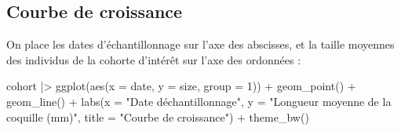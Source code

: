 \documentclass[
  french,
  a4paper,
  DIV=11,
  numbers=noendperiod,
  oneside]{scrreprt}
\newenvironment{Shaded}{}{}
\newcommand{\AttributeTok}[1]{\textcolor[rgb]{0.84,0.23,0.29}{#1}}
\newcommand{\DecValTok}[1]{\textcolor[rgb]{0.00,0.36,0.77}{#1}}
\newcommand{\FunctionTok}[1]{\textcolor[rgb]{0.44,0.26,0.76}{#1}}
\newcommand{\NormalTok}[1]{\textcolor[rgb]{0.14,0.16,0.18}{#1}}
\newcommand{\SpecialCharTok}[1]{\textcolor[rgb]{0.00,0.36,0.77}{#1}}
\newcommand{\StringTok}[1]{\textcolor[rgb]{0.01,0.18,0.38}{#1}}
\begin{document}
\begin{tcolorbox}
\section{Courbe de croissance}\label{courbe-de-croissance}

On place les dates d'échantillonnage sur l'axe des abscisses, et la
taille moyennes des individus de la cohorte d'intérêt sur l'axe des
ordonnées :

\begin{Shaded}
\begin{Highlighting}[]
\NormalTok{cohort }\SpecialCharTok{|\textgreater{}}
  \FunctionTok{ggplot}\NormalTok{(}\FunctionTok{aes}\NormalTok{(}\AttributeTok{x =}\NormalTok{ date, }\AttributeTok{y =}\NormalTok{ size, }\AttributeTok{group =} \DecValTok{1}\NormalTok{)) }\SpecialCharTok{+}
  \FunctionTok{geom\_point}\NormalTok{() }\SpecialCharTok{+}
  \FunctionTok{geom\_line}\NormalTok{() }\SpecialCharTok{+}
  \FunctionTok{labs}\NormalTok{(}\AttributeTok{x =} \StringTok{"Date d\textquotesingle{}échantillonnage"}\NormalTok{,}
       \AttributeTok{y =} \StringTok{"Longueur moyenne de la coquille (mm)"}\NormalTok{,}
       \AttributeTok{title =} \StringTok{"Courbe de croissance"}\NormalTok{) }\SpecialCharTok{+}
  \FunctionTok{theme\_bw}\NormalTok{()}
\end{Highlighting}
\end{Shaded}


{
\makeatletter
\def\LT@makecaption#1#2#3{%
  \noalign{\smash{\hbox{\kern\textwidth\rlap{\kern\marginparsep
  \parbox[t]{\marginparwidth}{%
    \footnotesize{%
      \vspace{(1.1\baselineskip)}
    #1{#2: }\ignorespaces #3}}}}}}%
    }
\makeatother

\begin{figure}[H]



\end{figure}}
\end{tcolorbox}
\end{document}
